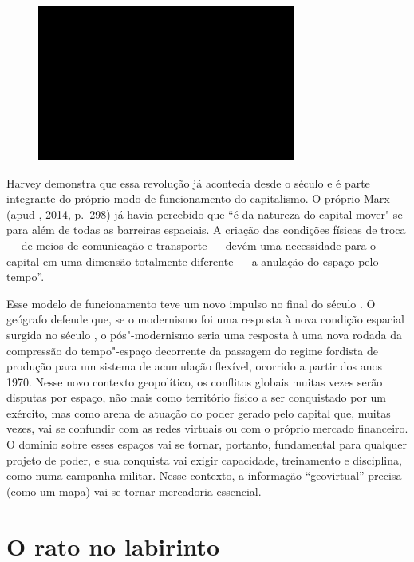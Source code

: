 \begin{figure}[!ht]

\centering
 \includegraphics[width=85mm]{./imgs/im1.jpg}
\caption{\tiny{}}

\end{figure}

Harvey demonstra que essa revolução já acontecia desde o século  e é
parte integrante do próprio modo de funcionamento do capitalismo. O
próprio Marx (apud , 2014, p.~298) já havia percebido que ``é da natureza do capital mover"-se
para além de todas as barreiras espaciais. A criação das condições
físicas de troca --- de meios de comunicação e transporte --- devém uma
necessidade para o capital em uma dimensão totalmente diferente --- a
anulação do espaço pelo tempo''.

Esse modelo de funcionamento teve um novo impulso no final do século .
O geógrafo defende que, se o modernismo foi uma resposta à nova condição
espacial surgida no século , o pós"-modernismo seria uma resposta à
uma nova rodada da compressão do tempo"-espaço decorrente da passagem do
regime fordista de produção para um sistema de acumulação flexível,
ocorrido a partir dos anos 1970. Nesse novo contexto geopolítico, os
conflitos globais muitas vezes serão disputas por espaço, não mais como
território físico a ser conquistado por um exército, mas como arena de
atuação do poder gerado pelo capital que, muitas vezes, vai se confundir
com as redes virtuais ou com o próprio mercado financeiro. O domínio
sobre esses espaços vai se tornar, portanto, fundamental para qualquer
projeto de poder, e sua conquista vai exigir capacidade, treinamento e
disciplina, como numa campanha militar. Nesse contexto, a informação
``geovirtual'' precisa (como um mapa) vai se tornar mercadoria
essencial.

\chapter{O rato no labirinto}

